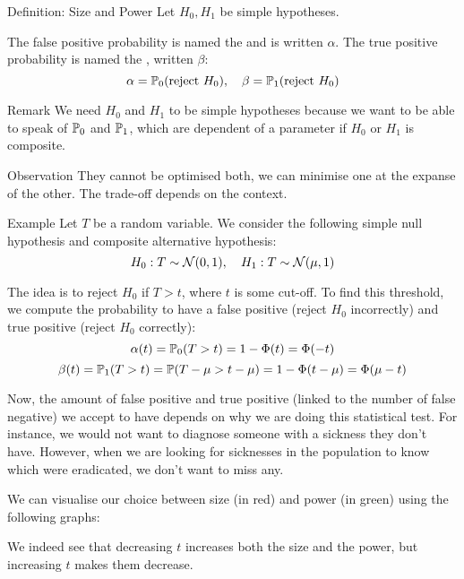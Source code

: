 \documentclass[a4paper]{article}
\begin{document}
\begin{parag}{Definition: Size and Power}
    Let $H_0, H_1$ be simple hypotheses.

    The false positive probability is named the  and is written $\alpha$. The true positive probability is named the , written $\beta$: 
    \[\alpha = \prob_0\left(\text{reject } H_0\right), \mathspace \beta = \prob_1\left(\text{reject } H_0\right)\]
    
    \begin{subparag}{Remark}
        We need $H_0$ and $H_1$ to be simple hypotheses because we want to be able to speak of $\mathbb{P}_0$ and $\mathbb{P}_1$, which are dependent of a parameter if $H_0$ or $H_1$ is composite.
    \end{subparag}
    
    \begin{subparag}{Observation}
        They cannot be optimised both, we can minimise one at the expanse of the other. The trade-off depends on the context.
    \end{subparag}
\end{parag}

\begin{parag}{Example}
    Let $T$ be a random variable. We consider the following simple null hypothesis and composite alternative hypothesis: 
    \[H_0: T \followsdistr \mathcal{N}\left(0,1\right), \mathspace H_1: T \followsdistr \mathcal{N}\left(\mu, 1\right)\]
    
    The idea is to reject $H_0$ if $T > t$, where $t$ is some cut-off. To find this threshold, we compute the probability to have a false positive (reject $H_0$ incorrectly) and true positive (reject $H_0$ correctly): 
    \[\alpha\left(t\right) = \prob_0\left(T > t\right) = 1 - \Phi\left(t\right) = \Phi\left(-t\right)\] 
    \[\beta\left(t\right) = \prob_1\left(T > t\right) = \prob\left(T - \mu > t - \mu\right) = 1 - \Phi\left(t - \mu\right) = \Phi\left(\mu - t\right)\]
    
    Now, the amount of false positive and true positive (linked to the number of false negative) we accept to have depends on why we are doing this statistical test. For instance, we would not want to diagnose someone with a sickness they don't have. However, when we are looking for sicknesses in the population to know which were eradicated, we don't want to miss any.

    We can visualise our choice between size (in red) and power (in green) using the following graphs:

    We indeed see that decreasing $t$ increases both the size and the power, but increasing $t$ makes them decrease.
\end{parag}
\end{document}
